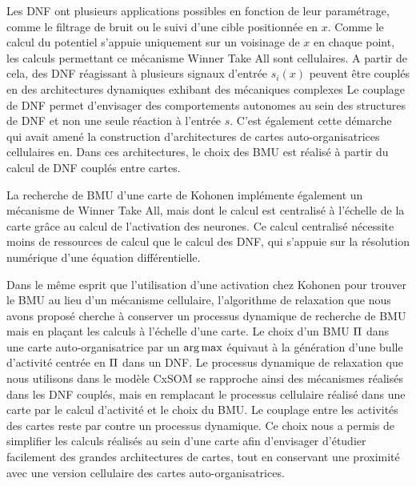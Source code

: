 \documentclass[../main]{subfiles}
\begin{document}
Les DNF ont plusieurs applications possibles en fonction de leur paramétrage, comme le filtrage de bruit ou le suivi d'une cible positionnée en $x$.
Comme le calcul du potentiel s'appuie uniquement sur un voisinage de $x$ en chaque point, les calculs permettant ce mécanisme Winner Take All sont cellulaires.
A partir de cela, des DNF réagissant à plusieurs signaux d'entrée $s_i(x)$ peuvent être couplés en des architectures dynamiques exhibant des mécaniques complexes \cite{Fix2011ADN, Sandamirskaya2014DynamicNF}
Le couplage de DNF permet d'envisager des comportements autonomes au sein des structures de DNF et non une seule réaction à l'entrée $s$. C'est également cette démarche qui avait amené la construction d'architectures de cartes auto-organisatrices cellulaires en\cite{khouzam_neural_2014,menard05}. Dans ces architectures, le choix des BMU est réalisé à partir du calcul de DNF couplés entre cartes.

La recherche de BMU d'une carte de Kohonen implémente également un mécanisme de Winner Take All, mais dont le calcul est centralisé à l'échelle de la carte grâce au calcul de l'activation des neurones.
Ce calcul centralisé nécessite moins de ressources de calcul que le calcul des DNF, qui s'appuie sur la résolution numérique d'une équation différentielle.

Dans le même esprit que l'utilisation d'une activation chez Kohonen pour trouver le BMU au lieu d'un mécanisme cellulaire, l'algorithme de relaxation que nous avons proposé cherche à conserver un processus dynamique de recherche de BMU mais en plaçant les calculs à l'échelle d'une carte. 
Le choix d'un BMU $\Pi$ dans une carte auto-organisatrice par un $\operatorname*{arg\,max}$ équivaut à la génération d'une bulle d'activité centrée en $\Pi$ dans un DNF. 
Le processus dynamique de relaxation que nous utilisons dans le modèle CxSOM se rapproche ainsi des mécanismes réalisés dans les DNF couplés, mais en remplacant le processus cellulaire réalisé dans une carte par le calcul d'activité et le choix du BMU. Le couplage entre les activités des cartes reste par contre un processus dynamique.
Ce choix nous a permis de simplifier les calculs réalisés au sein d'une carte afin d'envisager d'étudier facilement des grandes architectures de cartes, tout en conservant une proximité avec une version cellulaire des cartes auto-organisatrices.
\end{document}
